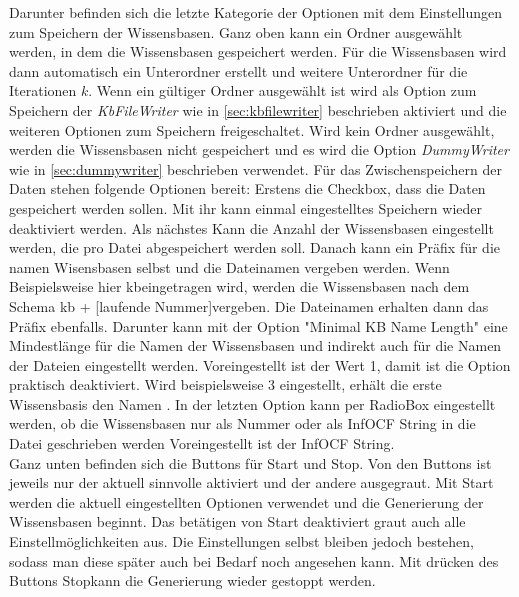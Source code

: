 \documentclass[12pt,a4paper]{article}
\begin{document}
Darunter befinden sich die letzte Kategorie der Optionen mit dem Einstellungen zum Speichern der Wissensbasen. Ganz oben kann ein Ordner ausgewählt werden, in dem die Wissensbasen gespeichert werden. Für die Wissensbasen wird dann automatisch ein Unterordner erstellt und weitere Unterordner für die Iterationen $k$. Wenn ein gültiger Ordner ausgewählt ist wird als Option zum Speichern der \textit{KbFileWriter} wie in \autoref{sec:kbfilewriter} beschrieben aktiviert und die weiteren Optionen zum Speichern freigeschaltet. Wird kein Ordner ausgewählt, werden die Wissensbasen nicht gespeichert und es wird die Option \textit{DummyWriter} wie in \autoref{sec:dummywriter} beschrieben verwendet. Für das Zwischenspeichern der Daten stehen folgende Optionen bereit: Erstens die Checkbox, dass die Daten gespeichert werden sollen. Mit ihr kann einmal eingestelltes Speichern wieder deaktiviert werden. Als nächstes Kann die Anzahl der Wissensbasen eingestellt werden, die pro Datei abgespeichert werden soll. Danach kann ein Präfix für die namen Wisensbasen selbst  und die Dateinamen vergeben werden. Wenn Beispielsweise hier \glqq kb\grqq \space eingetragen wird, werden die Wissensbasen nach dem Schema \glqq kb + [laufende Nummer]\grqq \space vergeben. Die Dateinamen erhalten dann das Präfix ebenfalls. Darunter kann mit der Option "Minimal KB Name Length" eine Mindestlänge für die Namen der Wissensbasen und indirekt auch für die Namen der Dateien eingestellt werden. Voreingestellt ist der Wert 1, damit ist die Option praktisch deaktiviert. Wird beispielsweise 3 eingestellt, erhält die erste Wissensbasis den Namen \grqq . In der letzten Option kann per RadioBox eingestellt werden, ob die Wissensbasen nur als Nummer oder als InfOCF String in die Datei geschrieben werden Voreingestellt ist der InfOCF String.\\
Ganz unten befinden sich die Buttons für Start und Stop. Von den Buttons ist jeweils nur der aktuell sinnvolle aktiviert und der andere ausgegraut. Mit \glqq Start \grqq \space werden die aktuell eingestellten Optionen verwendet und die Generierung der Wissensbasen beginnt. Das betätigen von Start deaktiviert graut auch alle Einstellmöglichkeiten aus. Die Einstellungen selbst bleiben jedoch bestehen, sodass man diese später auch bei Bedarf noch angesehen kann. Mit drücken des Buttons \glqq Stop\grqq \space kann die Generierung wieder gestoppt werden.
\end{document}
